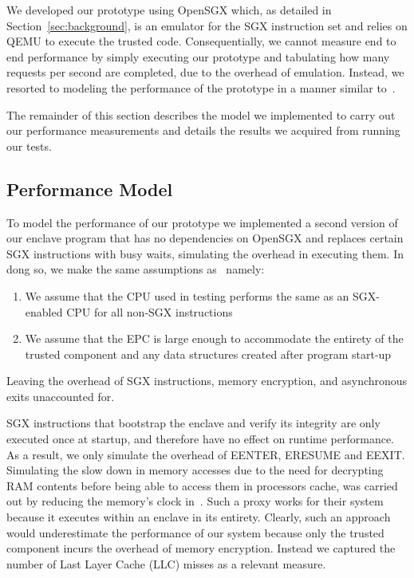 \documentclass[../main.tex]{subfiles}
\begin{document}
We developed our prototype using OpenSGX which, as detailed in 
Section~\ref{sec:background}, is an emulator for the SGX instruction set and
relies on QEMU to execute the trusted code. Consequentially, we cannot measure
end to end performance by simply executing our prototype and tabulating how
many requests per second are completed, due to the overhead of emulation.
Instead, we resorted to modeling the performance of the prototype in a manner
similar to~\cite{Baumann14}.

The remainder of this section describes the model we implemented to carry out
our performance measurements and details the results we acquired from running
our tests.

\subsection{Performance Model}

To model the performance of our prototype we implemented a second version of
our enclave program that has no dependencies on OpenSGX and replaces certain
SGX instructions with busy waits, simulating the overhead in executing them.
In dong so, we make the same assumptions as~\cite{Baumann14} namely:
\begin{enumerate}
  \item We assume that the CPU used in testing performs the same as an
    SGX-enabled CPU for all non-SGX instructions
  \item We assume that the EPC is large enough to accommodate the
    entirety of the trusted component and any data structures created
    after program start-up
\end{enumerate}
Leaving the overhead of SGX instructions, memory encryption, and asynchronous
exits unaccounted for.

SGX instructions that bootstrap the enclave and verify its integrity are only
executed once at startup, and therefore have no effect on runtime performance.
As a result, we only simulate the overhead of EENTER, ERESUME and EEXIT.
Simulating the slow down in memory accesses due to the need for decrypting RAM
contents before being able to access them in processors cache, was carried out
by reducing the memory's clock in~\cite{Baumann14}. Such a proxy works for
their system because it executes within an enclave in its entirety. Clearly,
such an approach would underestimate the performance of our system because
only the trusted component incurs the overhead of memory encryption. Instead
we captured the number of Last Layer Cache (LLC) misses as a relevant measure.
\end{document}
